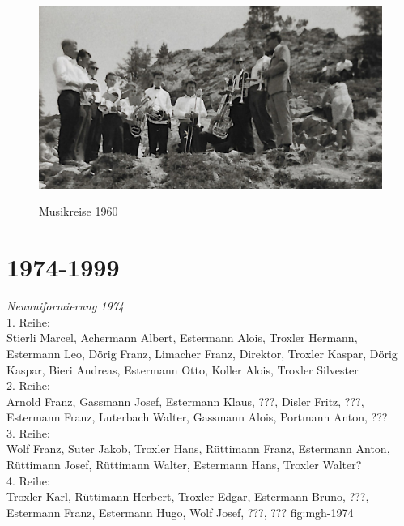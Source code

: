 \documentclass[]{book}
\begin{document}

\begin{figure}[ht]
    \centering
    \includegraphics[scale=2.0]{./chap/1950-1974/Musikreise-1960er.jpg}
    \label{fig:mgh-musigreise-1960}
    \caption{Musikreise 1960}
\end{figure}
\clearpage

\chapter{1974-1999}

{\emph{Neuuniformierung 1974}\\
    1. Reihe:\\
    Stierli Marcel, Achermann Albert, Estermann Alois, Troxler Hermann,
    Estermann Leo, Dörig Franz, Limacher Franz, Direktor, Troxler Kaspar, Dörig
    Kaspar, Bieri Andreas, Estermann Otto, Koller Alois, Troxler Silvester\\
    2. Reihe:\\
    Arnold Franz, Gassmann Josef, Estermann Klaus, ???, Disler Fritz, ???,
    Estermann Franz, Luterbach Walter, Gassmann Alois, Portmann Anton, ???\\
    3. Reihe:\\
    Wolf Franz, Suter Jakob, Troxler Hans, Rüttimann Franz, Estermann Anton,
    Rüttimann Josef, Rüttimann Walter, Estermann Hans, Troxler Walter?\\
    4. Reihe:\\
    Troxler Karl, Rüttimann Herbert, Troxler Edgar, Estermann Bruno, ???,
    Estermann Franz, Estermann Hugo, Wolf Josef, ???, ???
}
{fig:mgh-1974}


\end{document}
